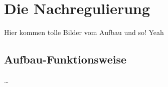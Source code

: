 
\chapter{Die Nachregulierung}
\label{ch:Die Nachregulierung}

Hier kommen tolle Bilder vom Aufbau und so! Yeah


\section{Aufbau-Funktionsweise}
\label{ch:Content1:sec:Section1}

\dots
